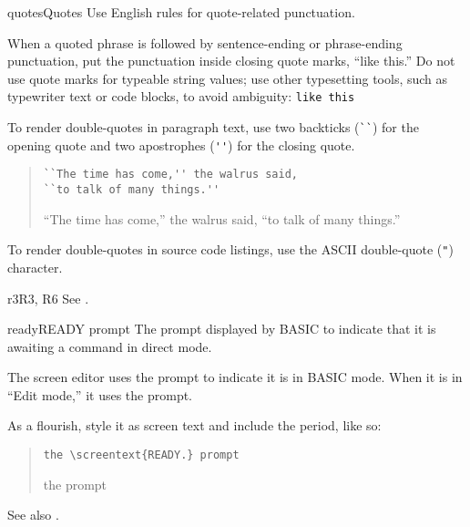 \begin{sgentry}{quotes}{Quotes}
    Use English rules for quote-related punctuation.

    When a quoted phrase is followed by sentence-ending or phrase-ending punctuation, put the punctuation inside closing quote marks, ``like this.'' Do not use quote marks for typeable string values; use other typesetting tools, such as typewriter text or code blocks, to avoid ambiguity: \texttt{like this}

    To render double-quotes in paragraph text, use two backticks (\verb|``|) for the opening quote and two apostrophes (\verb|''|) for the closing quote.

    \begin{quote}
        \begin{verbatim}
``The time has come,'' the walrus said,
``to talk of many things.''
        \end{verbatim}

        \hrulefill

        ``The time has come,'' the walrus said, ``to talk of many things.''
    \end{quote}

    To render double-quotes in source code listings, use the ASCII double-quote (\verb|"|) character.
\end{sgentry}

\begin{sgentry}{r3}{R3, R6}
    See .
\end{sgentry}

\begin{sgentry}{ready}{READY prompt}
    The prompt displayed by BASIC to indicate that it is awaiting a command in direct mode.

    The screen editor uses the  prompt to indicate it is in BASIC mode. When it is in ``Edit mode,'' it uses the  prompt.

    As a flourish, style it as screen text and include the period, like so:

    \begin{quote}
        \begin{verbatim}
the \screentext{READY.} prompt
        \end{verbatim}

        \hrulefill

        the  prompt
    \end{quote}

    See also .
\end{sgentry}

